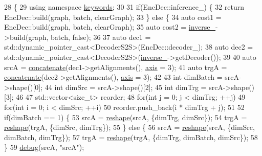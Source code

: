 \begin{DoxyCode}
28                                              \{
29     \textcolor{keyword}{using namespace }\hyperlink{namespacekeywords}{keywords};
30 
31     \textcolor{keywordflow}{if}(EncDec::inference\_) \{
32       \textcolor{keywordflow}{return} EncDec::build(graph, batch, clearGraph);
33     \} \textcolor{keywordflow}{else} \{
34       \textcolor{keyword}{auto} cost1 = EncDec::build(graph, batch, clearGraph);
35       \textcolor{keyword}{auto} cost2 = \hyperlink{classmarian_1_1EncoderDecoderSymmetric_a528d0f3b8902ccb3a1464fb7312d5c17}{inverse\_}->build(graph, batch, \textcolor{keyword}{false});
36 
37       \textcolor{keyword}{auto} dec1 = std::dynamic\_pointer\_cast<DecoderS2S>(EncDec::decoder\_);
38       \textcolor{keyword}{auto} dec2 = std::dynamic\_pointer\_cast<DecoderS2S>(\hyperlink{classmarian_1_1EncoderDecoderSymmetric_a528d0f3b8902ccb3a1464fb7312d5c17}{inverse\_}->getDecoder());
39 
40       \textcolor{keyword}{auto} srcA = \hyperlink{namespacemarian_a2791a2c8f79a938f5cb22ae613680675}{concatenate}(dec1->getAlignments(), \hyperlink{namespacemarian_1_1keywords_ace9158eabbddaca833133f12da98b9d6}{axis} = 3);
41       \textcolor{keyword}{auto} trgA = \hyperlink{namespacemarian_a2791a2c8f79a938f5cb22ae613680675}{concatenate}(dec2->getAlignments(), \hyperlink{namespacemarian_1_1keywords_ace9158eabbddaca833133f12da98b9d6}{axis} = 3);
42 
43       \textcolor{keywordtype}{int} dimBatch = srcA->shape()[0];
44       \textcolor{keywordtype}{int} dimSrc = srcA->shape()[2];
45       \textcolor{keywordtype}{int} dimTrg = srcA->shape()[3];
46 
47       std::vector<size\_t> reorder;
48       \textcolor{keywordflow}{for}(\textcolor{keywordtype}{int} j = 0; j < dimTrg; ++j)
49         \textcolor{keywordflow}{for}(\textcolor{keywordtype}{int} i = 0; i < dimSrc; ++i)
50           reorder.push\_back(i * dimTrg + j);
51 
52       \textcolor{keywordflow}{if}(dimBatch == 1) \{
53         srcA = \hyperlink{namespacemarian_acd984f43188d0ae23c2a6ef13ae5293f}{reshape}(srcA, \{dimTrg, dimSrc\});
54         trgA = \hyperlink{namespacemarian_acd984f43188d0ae23c2a6ef13ae5293f}{reshape}(trgA, \{dimSrc, dimTrg\});
55       \} \textcolor{keywordflow}{else} \{
56         srcA = \hyperlink{namespacemarian_acd984f43188d0ae23c2a6ef13ae5293f}{reshape}(srcA, \{dimSrc, dimBatch, dimTrg\});
57         trgA = \hyperlink{namespacemarian_acd984f43188d0ae23c2a6ef13ae5293f}{reshape}(trgA, \{dimTrg, dimBatch, dimSrc\});
58       \}
59       \hyperlink{namespacemarian_a442bfa469f081af4c2665c341efc71ce}{debug}(srcA, \textcolor{stringliteral}{"srcA"});

\end{DoxyCode}
